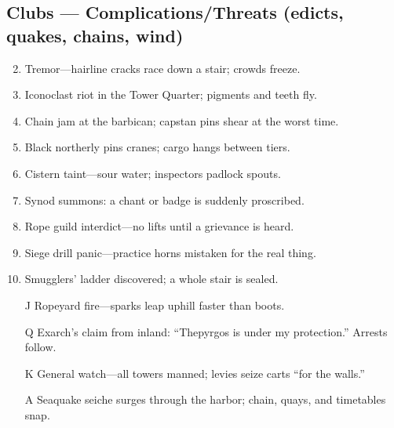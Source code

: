 \subsection*{Clubs --- Complications/Threats (edicts, quakes, chains, wind)}
\label{sec:thepyrgos-complications}
\begin{enumerate}
\setcounter{enumi}{1}
\item Tremor---hairline cracks race down a stair; crowds freeze.
\item Iconoclast riot in the Tower Quarter; pigments and teeth fly.
\item Chain jam at the barbican; capstan pins shear at the worst time.
\item Black northerly pins cranes; cargo hangs between tiers.
\item Cistern taint---sour water; inspectors padlock spouts.
\item Synod summons: a chant or badge is suddenly proscribed.
\item Rope guild interdict---no lifts until a grievance is heard.
\item Siege drill panic---practice horns mistaken for the real thing.
\item Smugglers' ladder discovered; a whole stair is sealed.
\item[J] Ropeyard fire---sparks leap uphill faster than boots.
\item[Q] Exarch's claim from inland: ``Thepyrgos is under my protection.'' Arrests follow.
\item[K] General watch---all towers manned; levies seize carts ``for the walls.''
\item[A] Seaquake seiche surges through the harbor; chain, quays, and timetables snap.
\end{enumerate}


